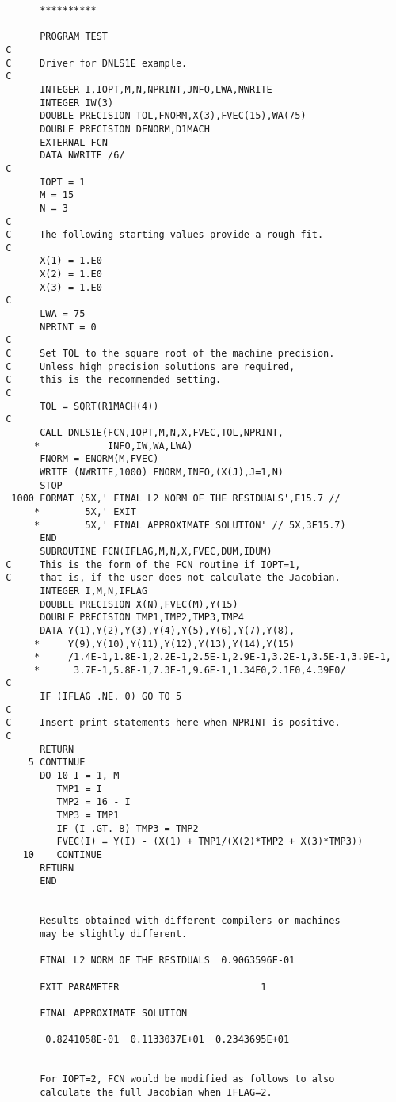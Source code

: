 \begin{verbatim}
       **********

       PROGRAM TEST
 C
 C     Driver for DNLS1E example.
 C
       INTEGER I,IOPT,M,N,NPRINT,JNFO,LWA,NWRITE
       INTEGER IW(3)
       DOUBLE PRECISION TOL,FNORM,X(3),FVEC(15),WA(75)
       DOUBLE PRECISION DENORM,D1MACH
       EXTERNAL FCN
       DATA NWRITE /6/
 C
       IOPT = 1
       M = 15
       N = 3
 C
 C     The following starting values provide a rough fit.
 C
       X(1) = 1.E0
       X(2) = 1.E0
       X(3) = 1.E0
 C
       LWA = 75
       NPRINT = 0
 C
 C     Set TOL to the square root of the machine precision.
 C     Unless high precision solutions are required,
 C     this is the recommended setting.
 C
       TOL = SQRT(R1MACH(4))
 C
       CALL DNLS1E(FCN,IOPT,M,N,X,FVEC,TOL,NPRINT,
      *            INFO,IW,WA,LWA)
       FNORM = ENORM(M,FVEC)
       WRITE (NWRITE,1000) FNORM,INFO,(X(J),J=1,N)
       STOP
  1000 FORMAT (5X,' FINAL L2 NORM OF THE RESIDUALS',E15.7 //
      *        5X,' EXIT
      *        5X,' FINAL APPROXIMATE SOLUTION' // 5X,3E15.7)
       END
       SUBROUTINE FCN(IFLAG,M,N,X,FVEC,DUM,IDUM)
 C     This is the form of the FCN routine if IOPT=1,
 C     that is, if the user does not calculate the Jacobian.
       INTEGER I,M,N,IFLAG
       DOUBLE PRECISION X(N),FVEC(M),Y(15)
       DOUBLE PRECISION TMP1,TMP2,TMP3,TMP4
       DATA Y(1),Y(2),Y(3),Y(4),Y(5),Y(6),Y(7),Y(8),
      *     Y(9),Y(10),Y(11),Y(12),Y(13),Y(14),Y(15)
      *     /1.4E-1,1.8E-1,2.2E-1,2.5E-1,2.9E-1,3.2E-1,3.5E-1,3.9E-1,
      *      3.7E-1,5.8E-1,7.3E-1,9.6E-1,1.34E0,2.1E0,4.39E0/
 C
       IF (IFLAG .NE. 0) GO TO 5
 C
 C     Insert print statements here when NPRINT is positive.
 C
       RETURN
     5 CONTINUE
       DO 10 I = 1, M
          TMP1 = I
          TMP2 = 16 - I
          TMP3 = TMP1
          IF (I .GT. 8) TMP3 = TMP2
          FVEC(I) = Y(I) - (X(1) + TMP1/(X(2)*TMP2 + X(3)*TMP3))
    10    CONTINUE
       RETURN
       END


       Results obtained with different compilers or machines
       may be slightly different.

       FINAL L2 NORM OF THE RESIDUALS  0.9063596E-01

       EXIT PARAMETER                         1

       FINAL APPROXIMATE SOLUTION

        0.8241058E-01  0.1133037E+01  0.2343695E+01


       For IOPT=2, FCN would be modified as follows to also
       calculate the full Jacobian when IFLAG=2.


\end{verbatim}
